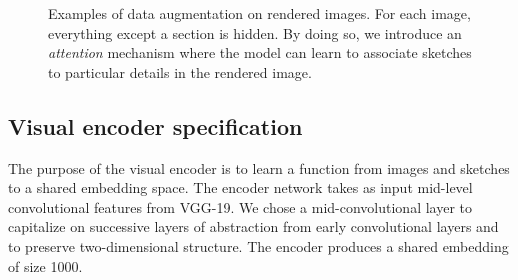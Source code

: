 \documentclass[9pt,twocolumn,twoside]{pnas-new}
\begin{document}
{\begin{figure}[h!]
    \centering
    \caption{Examples of data augmentation on rendered images. For each image, everything except a section is hidden. By doing so, we introduce an \emph{attention} mechanism where the model can learn to associate sketches to particular details in the rendered image.}
    \label{fig:augment_example}
\end{figure}

\subsection*{Visual encoder specification}

The purpose of the visual encoder is to learn a function from images and sketches to a shared embedding space. The encoder network takes as input mid-level convolutional features from VGG-19.   We chose a mid-convolutional layer to capitalize on successive layers of abstraction from early convolutional layers and to preserve two-dimensional structure. The encoder produces a shared embedding of size 1000. 

}
\end{document}
